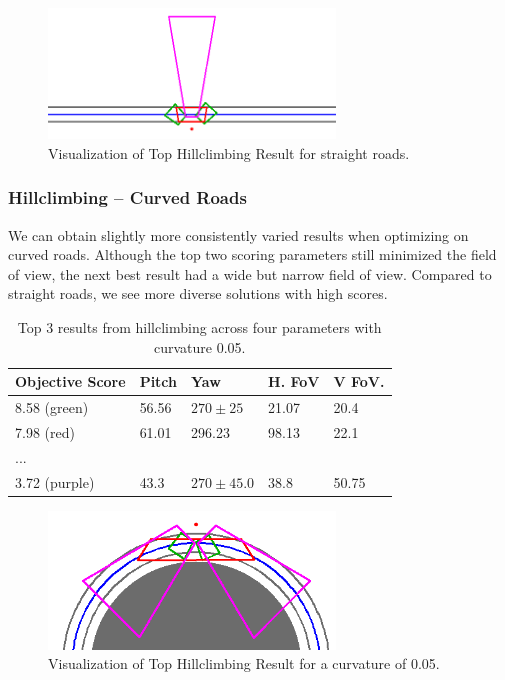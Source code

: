 \documentclass[a4paper,12pt,twoside,openright]{report}
\begin{document}
\begin{figure}[htb]
    \centering
    \includegraphics[width=3in]{figures/simple_objective/top_hillclimb.png}
    \caption[Top Hillclimbing Result]{Visualization of Top Hillclimbing Result for straight roads.}
    \label{fig:simpleobjective:hillclimbing straight}
\end{figure}

\subsubsection{Hillclimbing -- Curved Roads}

We can obtain slightly more consistently varied results when optimizing
on curved roads. Although the top two scoring parameters
still minimized the field of view, the next best result
had a wide but narrow field of view. Compared to straight roads,
we see more diverse solutions with high scores.

\begin{table}[htb]
    \centering
    \caption[Hillclimbing Top Scorers]{Top 3 results from hillclimbing across four parameters with curvature 0.05.}
    \label{tab:simpleobjective:hillclimb}
    \begin{tabular}{@{}lllll@{}}
        \toprule
        Objective Score & Pitch & Yaw        & H. FoV & V FoV. \\ \midrule
        8.58  (green)   & 56.56 & $270\pm25$ & 21.07  & 20.4  \\
        7.98  (red)     & 61.01 & 296.23     & 98.13  & 22.1  \\ 
        ... \\
        3.72  (purple)  & 43.3  &  $270\pm45.0$ & 38.8   & 50.75   \\ \bottomrule
    \end{tabular}
\end{table}

\begin{figure}[htb]
    \centering
    \includegraphics[width=3in]{figures/simple_objective/hillclimb_curvature.png}
    \caption[Top Hillclimbing Result]{Visualization of Top Hillclimbing Result for a curvature of 0.05.}
    \label{fig:simpleobjective:hillclimb result}
\end{figure}
\end{document}
